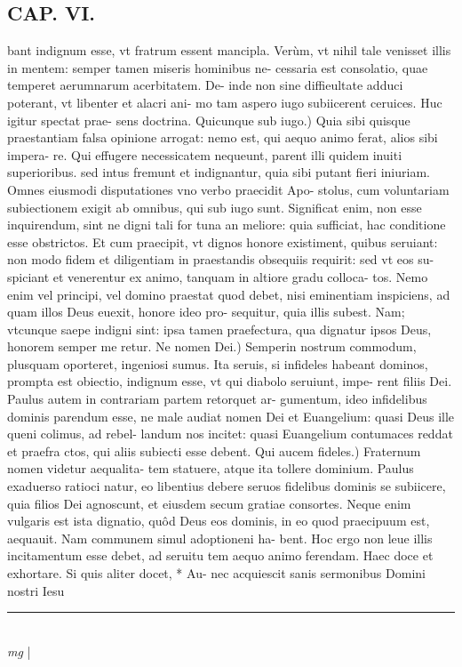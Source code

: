 \documentclass{article}
\begin{document}
\begin{pages}
\section*{CAP. VI. }
\marginpar{[ p.73 ]}\pstart bant indignum esse, vt fratrum essent mancipla. Verùm, vt nihil tale venisset illis in mentem: semper tamen miseris hominibus ne- cessaria est consolatio, quae temperet aerumnarum acerbitatem. De- inde non sine diffieultate adduci poterant, vt libenter et alacri ani- mo tam aspero iugo subiicerent ceruices. Huc igitur spectat prae- sens doctrina.  \pend\pstart Quicunque sub iugo.) Quia sibi quisque praestantiam falsa opinione arrogat: nemo est, qui aequo animo ferat, alios sibi impera- re. Qui effugere necessicatem nequeunt, parent illi quidem inuiti superioribus. sed intus fremunt et indignantur, quia sibi putant fieri iniuriam. Omnes eiusmodi disputationes vno verbo praecidit Apo- stolus, cum voluntariam subiectionem exigit ab omnibus, qui sub iugo sunt. Significat enim, non esse inquirendum, sint ne digni tali for tuna an meliore: quia sufficiat, hac conditione esse obstrictos. Et cum praecipit, vt dignos honore existiment, quibus seruiant: non modo fidem et diligentiam in praestandis obsequiis requirit: sed vt eos su- spiciant et venerentur ex animo, tanquam in altiore gradu colloca- tos. Nemo enim vel principi, vel domino praestat quod debet, nisi eminentiam inspiciens, ad quam illos Deus euexit, honore ideo pro- sequitur, quia illis subest. Nam; vtcunque saepe indigni sint: ipsa tamen praefectura, qua dignatur ipsos Deus, honorem semper me retur.  \pend\pstart Ne nomen Dei.) Semperin nostrum commodum, plusquam oporteret, ingeniosi sumus. Ita seruis, si infideles habeant dominos, prompta est obiectio, indignum esse, vt qui diabolo seruiunt, impe- rent filiis Dei. Paulus autem in contrariam partem retorquet ar- gumentum, ideo infidelibus dominis parendum esse, ne male audiat nomen Dei et Euangelium: quasi Deus ille queni colimus, ad rebel- landum nos incitet: quasi Euangelium contumaces reddat et praefra ctos, qui aliis subiecti esse debent.  \pend\pstart Qui aucem fideles.) Fraternum nomen videtur aequalita- tem statuere, atque ita tollere dominium. Paulus exaduerso ratioci natur, eo libentius debere seruos fidelibus dominis se subiicere, quia filios Dei agnoscunt, et eiusdem secum gratiae consortes. Neque enim vulgaris est ista dignatio, quôd Deus eos dominis, in eo quod praecipuum est, aequauit. Nam communem simul adoptioneni ha- bent. Hoc ergo non leue illis incitamentum esse debet, ad seruitu tem aequo animo ferendam.  \pend\pstart Haec doce et exhortare. Si quis aliter docet, * Au- nec acquiescit sanis sermonibus Domini nostri Iesu  \pend
\vspace{0.5cm}\noindent
\vspace{0.2cm}\rule{1cm}{0.2pt}\\ 
\hspace{0.2cm}\textit{mg}
\footnotesize 
\normalsize| 

\end{pages}
\end{document}
